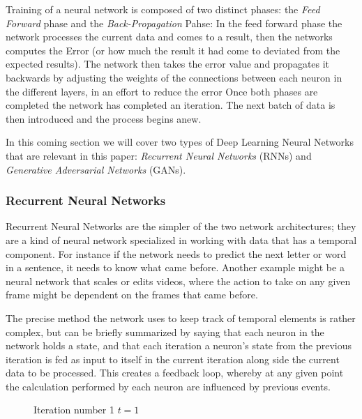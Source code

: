 Training of a neural network is composed of two distinct phases: the \emph{Feed Forward} phase and the \emph{Back-Propagation} Pahse: In the feed forward phase the network processes the current data and comes to a result, then the networks computes the Error (or how much the result it had come to deviated from the expected results). The network then takes the error value and propagates it backwards by adjusting 
the weights of the connections between each neuron in the different layers, in an effort to reduce the error
Once both phases are completed the network has completed an iteration. The next batch of data is then introduced and the process begins anew.

In this coming section we will cover two types of Deep Learning Neural Networks that are relevant in this paper: \emph{Recurrent Neural Networks} (RNNs) and  \emph{Generative Adversarial Networks} (GANs).
\clearpage

\subsubsection{Recurrent Neural Networks}
Recurrent Neural Networks are the simpler of the two network architectures; they are a kind of neural network specialized in working with data that has a temporal component.
For instance if the network needs to predict the next letter or word in a sentence, it needs to know what came before. Another example might be a neural network that scales or edits videos, where the action to take on any given frame might be dependent on the frames that came before.

The precise method the network uses to keep track of temporal elements is rather complex, but can be briefly summarized by saying that each neuron in the network holds a state, and that each iteration a neuron's state from the previous iteration is fed as input to itself in the current iteration along side the current data to be processed.
This creates a feedback loop, whereby at any given point the calculation performed by each neuron are influenced by previous events.

\begin{figure}[H]    
\centering
{}
\begin{center}
Iteration number 1 $t=1$
\end{center}
\end{figure}

